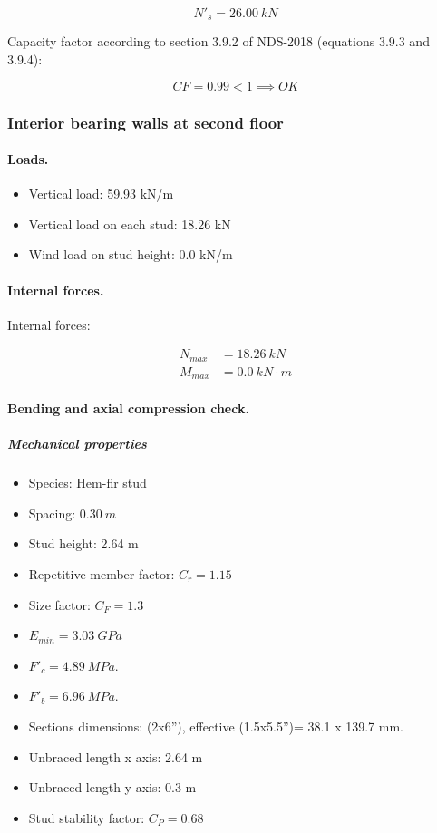 \begin{equation}
  N'_s= 26.00\ kN
\end{equation}

\noindent Capacity factor according to section 3.9.2 of NDS-2018 (equations 3.9.3 and 3.9.4):

\begin{equation}
  CF= 0.99 < 1 \implies OK
\end{equation}

\subsubsection{Interior bearing walls at second floor}

\paragraph{Loads.}

\begin{itemize}
\item Vertical load: 59.93 kN/m
\item Vertical load on each stud: 18.26 kN
\item Wind load on stud height: 0.0 kN/m
\end{itemize}

\paragraph{Internal forces.}

\noindent Internal forces:

\begin{align}
  N_{max}&= 18.26\ kN \\
  M_{max}&= 0.0\ kN \cdot m
\end{align}

\paragraph{Bending and axial compression check.}

\subparagraph{Mechanical properties}

\begin{itemize}
\item Species: Hem-fir stud
\item Spacing: $0.30\ m$
\item Stud height: 2.64 m
\item Repetitive member factor: $C_r= 1.15$
\item Size factor: $C_F= 1.3$
\item $E_{min}= 3.03\ GPa$
\item $F'_c= 4.89\ MPa$.
\item $F'_b= 6.96\ MPa$.
\item Sections dimensions: (2x6''), effective (1.5x5.5'')= 38.1 x 139.7  mm.
\item Unbraced length x axis: 2.64 m
\item Unbraced length y axis: 0.3 m
\item Stud stability factor: $C_P= 0.68$
\end{itemize}

